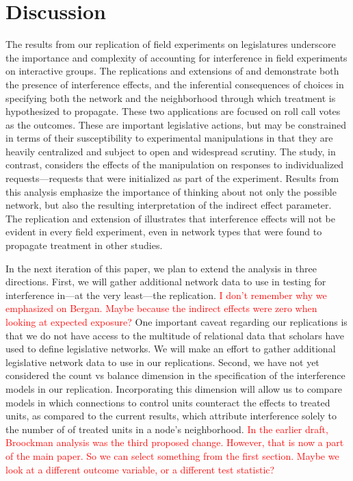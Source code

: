 \documentclass[12pt]{article}
\begin{document}
\section{Discussion}
The results from our replication of field experiments on legislatures underscore the importance and complexity of accounting for interference in field experiments on interactive groups. The replications and extensions of \citet{coppock2014information} and \citet{bergan2015call} demonstrate both the presence of interference effects, and the inferential consequences of choices in specifying both the network and the neighborhood through which treatment is hypothesized to propagate. These two applications are focused on roll call votes as the outcomes. These are important legislative actions, but may be constrained in terms of their susceptibility to experimental manipulations in that they are heavily centralized and subject to open and widespread scrutiny. The \citet{broockman2013black} study, in contrast, considers the effects of the manipulation on responses to individualized requests---requests that were initialized as part of the experiment. Results from this analysis emphasize the importance of thinking about not only the possible network, but also the resulting interpretation of the indirect effect parameter. The replication and extension of \citet{bergan2015call} illustrates that interference effects will not be evident in every field experiment, even in network types that were found to propagate treatment in other studies. 


In the next iteration of this paper, we plan to extend the analysis in three directions. First, we will gather additional network data to use in testing for interference in---at the very least---the \citet{bergan2015call} replication. \textcolor{red}{I don't remember why we emphasized on Bergan. Maybe because the indirect effects were zero when looking at expected exposure?} One important caveat regarding our replications is that we do not have access to the multitude of relational data that scholars have used to define legislative networks. We will make an effort to gather additional legislative network data to use in our replications. Second, we have not yet considered the count vs balance dimension in the specification of the interference models in our replication. Incorporating this dimension will allow us to compare models in which connections to control units counteract the effects to treated units, as compared to the current results, which attribute interference solely to the number of of treated units in a node's neighborhood. \textcolor{red}{In the earlier draft, Broockman analysis was the third proposed change. However, that is now a part of the main paper. So we can select something from the first section. Maybe we look at a different outcome variable, or a different test statistic?}
\end{document}
